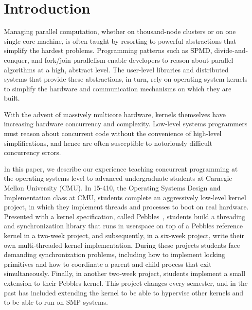 \section{Introduction}

Managing parallel computation, whether on thousand-node clusters or on one single-core machine, is often taught by resorting to powerful abstractions that simplify the hardest problems.
Programming patterns such as SPMD, divide-and-conquer, and fork/join parallelism enable developers to reason about parallel algorithms at a high, abstract level.
The user-level libraries and distributed systems that provide these abstractions, in turn, rely on operating system kernels to simplify the hardware and communication mechanisms on which they are built. %

With the advent of massively multicore hardware,
kernels themselves have increasing hardware concurrency and complexity. %
Low-level systems programmers must reason about concurrent code without the convenience of high-level simplifications, and hence are often susceptible to notoriously difficult concurrency errors.

In this paper, we describe our experience teaching concurrent programming at the operating systems level to advanced undergraduate students at Carnegie Mellon University (CMU).
In 15-410, the Operating Systems Design and Implementation class at CMU, students complete an aggressively low-level kernel project, in which they implement threads and processes to boot on real hardware.
Presented with a kernel specification, called Pebbles~\cite{kspec}, students build a threading and synchronization library that runs in userspace on top of a Pebbles reference kernel in a two-week project, and subsequently, in a six-week project, write their own multi-threaded kernel implementation.
During these projects students face demanding synchronization problems, including how to implement locking primitives and how to coordinate a parent and child process that exit simultaneously.
Finally, in another two-week project, students implement a small extension to their Pebbles kernel. This project changes every semester, and in the past has included extending the kernel to be able to hypervise other kernels and to be able to run on SMP systems.

